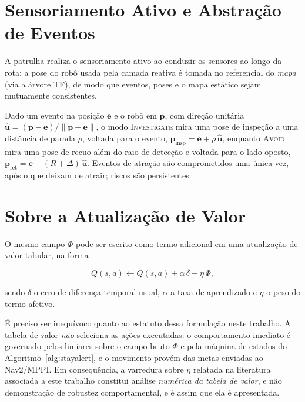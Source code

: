 \section{Sensoriamento Ativo e Abstração de Eventos}
\label{sec:prop-sensoriamento}

A patrulha realiza o sensoriamento ativo ao conduzir os sensores ao longo da rota; a
pose do robô usada pela camada reativa é tomada no referencial do \emph{mapa} (via a
árvore TF), de modo que eventos, poses e o mapa estático sejam mutuamente
consistentes.

Dado um evento na posição $\bm{e}$ e o robô em $\bm{p}$, com direção unitária
$\hat{\bm{u}}=(\bm{p}-\bm{e})/\lVert\bm{p}-\bm{e}\rVert$, o modo
\textsc{Investigate} mira uma pose de inspeção a uma distância de parada $\rho$,
voltada para o evento,
$\bm{p}_{\text{insp}}=\bm{e}+\rho\,\hat{\bm{u}}$, enquanto \textsc{Avoid} mira uma
pose de recuo além do raio de detecção e voltada para o lado oposto,
$\bm{p}_{\text{ret}}=\bm{e}+(R+\Delta)\,\hat{\bm{u}}$. Eventos de atração são
comprometidos uma única vez, após o que deixam de atrair; riscos são persistentes.

\section{Sobre a Atualização de Valor}
\label{sec:prop-atualizacao}

O mesmo campo $\Phi$ pode ser escrito como termo adicional em uma atualização de
valor tabular, na forma

\begin{equation}
\label{eq:prop-bellman}
Q(s,a) \leftarrow Q(s,a) + \alpha\,\delta + \eta\,\Phi,
\end{equation}

sendo $\delta$ o erro de diferença temporal usual, $\alpha$ a taxa de aprendizado e
$\eta$ o peso do termo afetivo.

É preciso ser inequívoco quanto ao estatuto dessa formulação neste trabalho. A tabela
de valor \emph{não} seleciona as ações executadas: o comportamento imediato é
governado pelos limiares sobre o campo bruto $\Phi$ e pela máquina de estados do
Algoritmo~\ref{alg:stayalert}, e o movimento provém das metas enviadas ao Nav2/MPPI.
Em consequência, a varredura sobre $\eta$ relatada na literatura associada a este
trabalho constitui análise \emph{numérica da tabela de valor}, e não demonstração de
robustez comportamental, e é assim que ela é apresentada.

